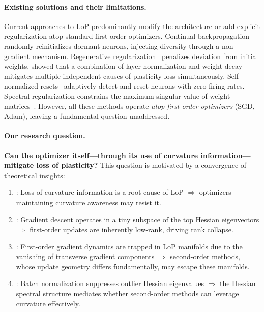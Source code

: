 \documentclass{article}
\begin{document}
\paragraph{Existing solutions and their limitations.} Current approaches to LoP predominantly modify the architecture or add explicit regularization atop standard first-order optimizers. Continual backpropagation~\citep{dohare2024loss} randomly reinitializes dormant neurons, injecting diversity through a non-gradient mechanism. Regenerative regularization~\citep{kumar2023maintaining} penalizes deviation from initial weights. \citet{lyle2025disentangling} showed that a combination of layer normalization and weight decay mitigates multiple independent causes of plasticity loss simultaneously. Self-normalized resets~\citep{lewandowski2025snr} adaptively detect and reset neurons with zero firing rates. Spectral regularization constrains the maximum singular value of weight matrices~\citep{miyato2018spectral}. However, all these methods operate \emph{atop first-order optimizers} (SGD, Adam), leaving a fundamental question unaddressed.

\paragraph{Our research question.} \textbf{Can the optimizer itself---through its use of curvature information---mitigate loss of plasticity?} This question is motivated by a convergence of theoretical insights:
\begin{enumerate}[leftmargin=*,nosep]
    \item \citet{lewandowski2024curvature}: Loss of curvature information is a root cause of LoP $\Rightarrow$ optimizers maintaining curvature awareness may resist it.
    \item \citet{gurari2018gradient}: Gradient descent operates in a tiny subspace of the top Hessian eigenvectors $\Rightarrow$ first-order updates are inherently low-rank, driving rank collapse.
    \item \citet{joudaki2026barriers}: First-order gradient dynamics are trapped in LoP manifolds due to the vanishing of transverse gradient components $\Rightarrow$ second-order methods, whose update geometry differs fundamentally, may escape these manifolds.
    \item \citet{ghorbani2019investigation}: Batch normalization suppresses outlier Hessian eigenvalues $\Rightarrow$ the Hessian spectral structure mediates whether second-order methods can leverage curvature effectively.
\end{enumerate}
\end{document}

